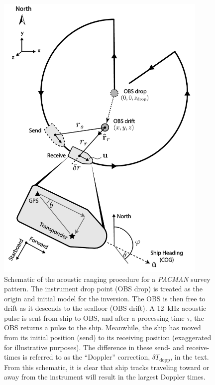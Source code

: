 \begin{figure}[h]
\begin{center}
\includegraphics[trim=0cm 0cm 0cm 0cm,clip=true,width=4in]{cartoon_v2.pdf}
\caption{Schematic of the acoustic ranging procedure for a \textit{PACMAN} survey pattern. The instrument drop point (OBS drop) is treated as the origin and initial model for the inversion. The OBS is then free to drift as it descends to the seafloor (OBS drift). A 12~kHz acoustic pulse is sent from ship to OBS, and after a processing time $\tau$, the OBS returns a pulse to the ship. Meanwhile, the ship has moved from its initial position (send) to its receiving position (exaggerated for illustrative purposes). The difference in these send- and receive-times is referred to as the ``Doppler'' correction, $\delta T_{\text{dopp}}$, in the text. From this schematic, it is clear that ship tracks traveling toward or away from the instrument will result in the largest Doppler times.}
\label{fig:cartoon}
\end{center}
\end{figure}

\newpage

